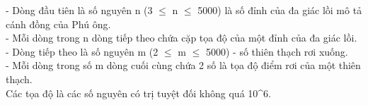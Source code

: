 - Dòng đầu tiên là số nguyên n (3  $\le$  n  $\le$  5000) là số đỉnh của đa giác lồi mô tả cánh đồng của Phú ông.   
\\   - Mỗi dòng trong n dòng tiếp theo chứa cặp tọa độ của một đỉnh của đa giác lồi.   
\\   - Dòng tiếp theo là số nguyên m (2  $\le$  m  $\le$  5000) - số thiên thạch rơi xuống.   
\\   - Mỗi dòng trong số m dòng cuối cùng chứa 2 số là tọa độ điểm rơi của một thiên thạch.   
\\   Các tọa độ là các số nguyên có trị tuyệt đối không quá 10^6.  

\
